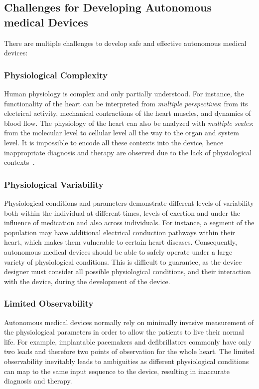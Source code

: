 \subsection{Challenges for Developing Autonomous medical Devices}
There are multiple challenges to develop safe and effective autonomous medical devices:

\subsubsection{Physiological Complexity} 
Human physiology is complex and only partially understood. 
For instance, the functionality of the heart can be interpreted from \emph{multiple perspectives}: from its electrical activity, mechanical contractions of the heart muscles, and dynamics of blood flow. 
The physiology of the heart can also be analyzed with \emph{multiple scales}: from the molecular level to cellular level all the way to the organ and system level. 
It is impossible to encode all these contexts into the device, hence inappropriate diagnosis and therapy are observed due to the lack of physiological contexts~\cite{killedbycode, icd_recall}.
	\subsubsection{Physiological Variability}
	Physiological conditions and parameters demonstrate different levels of variability both within the individual at different times, levels of exertion and under the influence of medication and also across individuals. 
	For instance, a segment of the population may have additional electrical conduction pathways within their heart, which makes them vulnerable to certain heart diseases.
	Consequently, autonomous medical devices should be able to safely operate under a large variety of physiological conditions. 
	This is difficult to guarantee, as the device designer must consider all possible physiological conditions, and their interaction with the device, during the development of the device.
	
	\subsubsection{Limited Observability} 
	Autonomous medical devices normally rely on minimally invasive measurement of the physiological parameters in order to allow the patients to live their normal life. 
	For example, implantable pacemakers and defibrillators commonly have only two leads and therefore two points of observation for the whole heart. 
	The limited observability inevitably leads to ambiguities as different physiological conditions can map to the same input sequence to the device, resulting in inaccurate diagnosis and therapy. 

